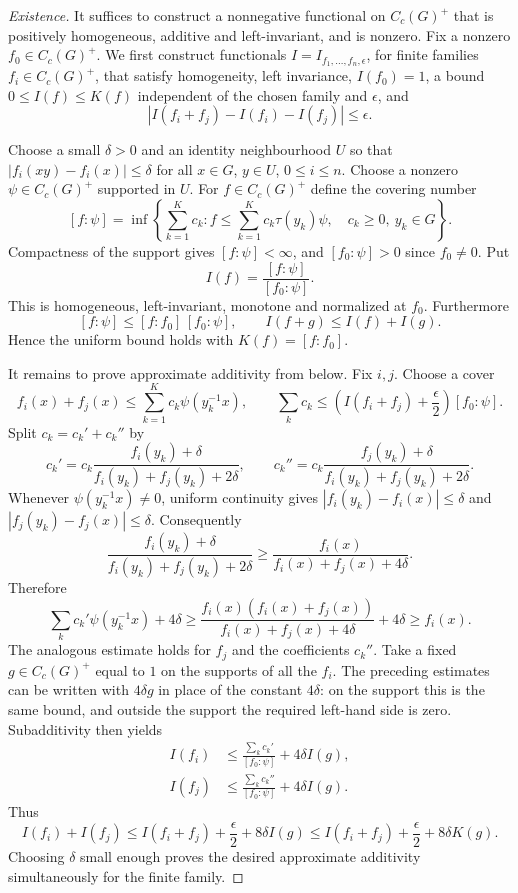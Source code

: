 \begin{proof}[Existence]
It suffices to construct a nonnegative functional on $C_c(G)^+$ that is
positively homogeneous, additive and left-invariant, and is nonzero.
Fix a nonzero $f_0\in C_c(G)^+$. We first construct functionals
$I=I_{f_1,\ldots,f_n,\epsilon}$, for finite families $f_i\in C_c(G)^+$,
that satisfy homogeneity, left invariance, $I(f_0)=1$, a bound
$0\leq I(f)\leq K(f)$ independent of the chosen family and $\epsilon$, and
\[
 |I(f_i+f_j)-I(f_i)-I(f_j)|\leq\epsilon.
\]

Choose a small $\delta>0$ and an identity neighbourhood $U$ so that
$|f_i(xy)-f_i(x)|\leq\delta$ for all $x\in G$, $y\in U$, $0\leq i\leq n$.
Choose a nonzero $\psi\in C_c(G)^+$ supported in $U$. For $f\in C_c(G)^+$
define the covering number
\[
 [f:\psi]=\inf\left\{\sum_{k=1}^Kc_k:
 f\leq\sum_{k=1}^Kc_k\tau(y_k)\psi,\quad c_k\geq0,\ y_k\in G\right\}.
\]
Compactness of the support gives $[f:\psi]<\infty$, and
$[f_0:\psi]>0$ since $f_0\ne0$. Put
\[
 I(f)=\frac{[f:\psi]}{[f_0:\psi]}.
\]
This is homogeneous, left-invariant, monotone and normalized at $f_0$.
Furthermore
\[
 [f:\psi]\leq[f:f_0]\,[f_0:\psi],\qquad
 I(f+g)\leq I(f)+I(g).
\]
Hence the uniform bound holds with $K(f)=[f:f_0]$.

It remains to prove approximate additivity from below. Fix $i,j$. Choose a
cover
\[
 f_i(x)+f_j(x)\leq\sum_{k=1}^Kc_k\psi(y_k^{-1}x),\qquad
 \sum_kc_k\leq\left(I(f_i+f_j)+\frac\epsilon2\right)[f_0:\psi].
\]
Split $c_k=c_k'+c_k''$ by
\[
 c_k'=c_k\frac{f_i(y_k)+\delta}{f_i(y_k)+f_j(y_k)+2\delta},\qquad
 c_k''=c_k\frac{f_j(y_k)+\delta}{f_i(y_k)+f_j(y_k)+2\delta}.
\]
Whenever $\psi(y_k^{-1}x)\ne0$, uniform continuity gives
$|f_i(y_k)-f_i(x)|\leq\delta$ and $|f_j(y_k)-f_j(x)|\leq\delta$.
Consequently
\[
 \frac{f_i(y_k)+\delta}{f_i(y_k)+f_j(y_k)+2\delta}
 \geq\frac{f_i(x)}{f_i(x)+f_j(x)+4\delta}.
\]
Therefore
\[
 \sum_kc_k'\psi(y_k^{-1}x)+4\delta
 \geq\frac{f_i(x)(f_i(x)+f_j(x))}{f_i(x)+f_j(x)+4\delta}+4\delta
 \geq f_i(x).
\]
The analogous estimate holds for $f_j$ and the coefficients $c_k''$.
Take a fixed $g\in C_c(G)^+$ equal to $1$ on the supports of all the $f_i$.
The preceding estimates can be written with $4\delta g$ in place of the
constant $4\delta$: on the support this is the same bound, and outside the
support the required left-hand side is zero. Subadditivity then yields
\[
\begin{aligned}
 I(f_i)&\leq\frac{\sum_kc_k'}{[f_0:\psi]}+4\delta I(g),\\
 I(f_j)&\leq\frac{\sum_kc_k''}{[f_0:\psi]}+4\delta I(g).
\end{aligned}
\]
Thus
\[
 I(f_i)+I(f_j)\leq I(f_i+f_j)+\frac\epsilon2+8\delta I(g)
 \leq I(f_i+f_j)+\frac\epsilon2+8\delta K(g).
\]
Choosing $\delta$ small enough proves the desired approximate additivity
simultaneously for the finite family.


\end{proof}
